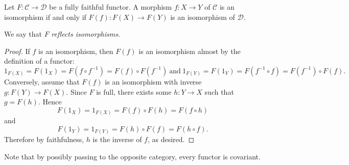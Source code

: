 \documentclass[dissertation.tex]{subfiles}
\begin{document}
\begin{prop}\label{p.2}
  Let $F \colon \mathscr{C} \rightarrow \mathscr{D}$ be a fully faithful functor.
  A morphism $f \colon X \rightarrow Y$ of $\mathscr{C}$ is an isomorphism if and only if $F(f) \colon F(X) \rightarrow F(Y)$ is an isomorphism of $\mathscr{D}$.

  We say that $F$ {\em reflects isomorphisms}.

  \begin{proof}
    If $f$ is an isomorphism, then $F(f)$ is an isomorphism almost by the definition of a functor: 
    $$1_{F(X)} = F(1_X) = F(f \circ f^{-1}) = F(f) \circ F(f^{-1}) \ \text{and}\ 1_{F(Y)} = F(1_Y) = F(f^{-1} \circ f) = F(f^{-1}) \circ F(f).$$
    Conversely, assume that $F(f)$ is an isomorphism with inverse $g : F(Y) \rightarrow F(X)$.
    Since $F$ is full, there exists some $h : Y \rightarrow X$ such that $g = F(h)$.
    Hence
    $$F(1_X) = 1_{F(X)} = F(f) \circ F(h) = F(f \circ h)$$
    and
    $$F(1_Y) = 1_{F(Y)} = F(h) \circ F(f)= F(h \circ f).$$
    Therefore by faithfulness, $h$ is the inverse of $f$, as desired.
  \end{proof}
\end{prop}
\begin{rmk}
  Note that by possibly passing to the opposite category, every functor is covariant.
\end{rmk}
\end{document}
